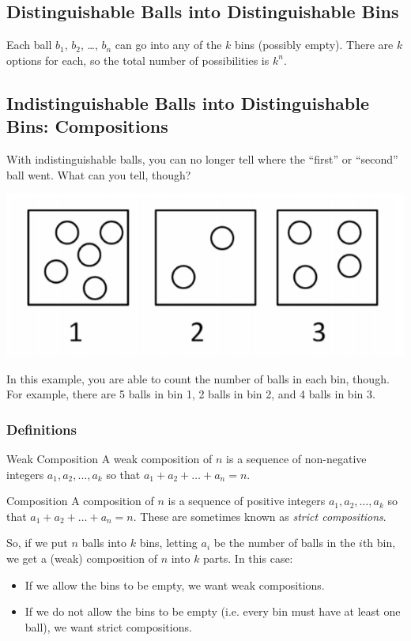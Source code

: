 \documentclass[letterpaper]{article}
\begin{document}
\subsection{Distinguishable Balls into Distinguishable Bins}
Each ball $b_1$, $b_2$, \dots, $b_n$ can go into any of the $k$ bins (possibly empty). There are $k$ options for each, so the total number of possibilities is $k^n$. 

\subsection{Indistinguishable Balls into Distinguishable Bins: Compositions}
With indistinguishable balls, you can no longer tell where the ``first'' or ``second'' ball went. What can you tell, though? 
\begin{center}
    \includegraphics[scale=0.4]{ind_ball_i_bin.PNG}
\end{center}
In this example, you are able to count the number of balls in each bin, though. For example, there are 5 balls in bin 1, 2 balls in bin 2, and 4 balls in bin 3.

\subsubsection{Definitions}

\begin{definition}{Weak Composition}{}
    A weak composition of $n$ is a sequence of non-negative integers $a_1, a_2, ..., a_k$ so that $a_1 + a_2 + \dots + a_n = n$.
\end{definition}

\begin{definition}{Composition}{}
    A composition of $n$ is a sequence of positive integers $a_1, a_2, \dots, a_k$ so that $a_1 + a_2 + \dots + a_n = n$. These are sometimes known as \emph{strict compositions}.
\end{definition}

So, if we put $n$ balls into $k$ bins, letting $a_i$ be the number of balls in the $i$th bin, we get a (weak) composition of $n$ into $k$ parts. In this case:
\begin{itemize}
    \item If we allow the bins to be empty, we want weak compositions. 
    \item If we do not allow the bins to be empty (i.e. every bin must have at least one ball), we want strict compositions. 
\end{itemize}
\end{document}
